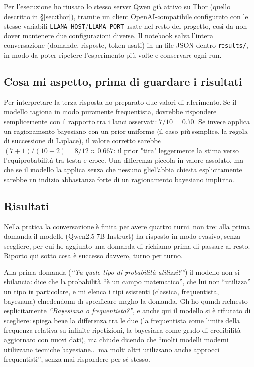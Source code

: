 Per l'esecuzione ho riusato lo stesso server Qwen già attivo su Thor (quello descritto in \S\ref{sec:thor}), tramite un client OpenAI-compatibile configurato con le stesse variabili \texttt{LLAMA\_HOST}/\texttt{LLAMA\_PORT} usate nel resto del progetto, così da non dover mantenere due configurazioni diverse. Il notebook salva l'intera conversazione (domande, risposte, token usati) in un file JSON dentro \texttt{results/}, in modo da poter ripetere l'esperimento più volte e conservare ogni run.

\subsection*{Cosa mi aspetto, prima di guardare i risultati}

Per interpretare la terza risposta ho preparato due valori di riferimento. Se il modello ragiona in modo puramente frequentista, dovrebbe rispondere semplicemente con il rapporto tra i lanci osservati: $7/10 = 0.70$. Se invece applica un ragionamento bayesiano con un prior uniforme (il caso più semplice, la regola di successione di Laplace), il valore corretto sarebbe $(7+1)/(10+2) = 8/12 \approx 0.667$: il prior "tira" leggermente la stima verso l'equiprobabilità tra testa e croce. Una differenza piccola in valore assoluto, ma che se il modello la applica senza che nessuno gliel'abbia chiesta esplicitamente sarebbe un indizio abbastanza forte di un ragionamento bayesiano implicito.

\subsection*{Risultati}

Nella pratica la conversazione è finita per avere quattro turni, non tre: alla prima domanda il modello (Qwen2.5-7B-Instruct) ha risposto in modo evasivo, senza scegliere, per cui ho aggiunto una domanda di richiamo prima di passare al resto. Riporto qui sotto cosa è successo davvero, turno per turno.

Alla prima domanda (\emph{``Tu quale tipo di probabilità utilizzi?''}) il modello non si sbilancia: dice che la probabilità ``è un campo matematico'', che lui non ``utilizza'' un tipo in particolare, e mi elenca i tipi esistenti (classica, frequentista, bayesiana) chiedendomi di specificare meglio la domanda. Gli ho quindi richiesto esplicitamente \emph{``Bayesiana o frequentista?''}, e anche qui il modello si è rifiutato di scegliere: spiega bene la differenza tra le due (la frequentista come limite della frequenza relativa su infinite ripetizioni, la bayesiana come grado di credibilità aggiornato con nuovi dati), ma chiude dicendo che ``molti modelli moderni utilizzano tecniche bayesiane... ma molti altri utilizzano anche approcci frequentisti'', senza mai rispondere per sé stesso.

